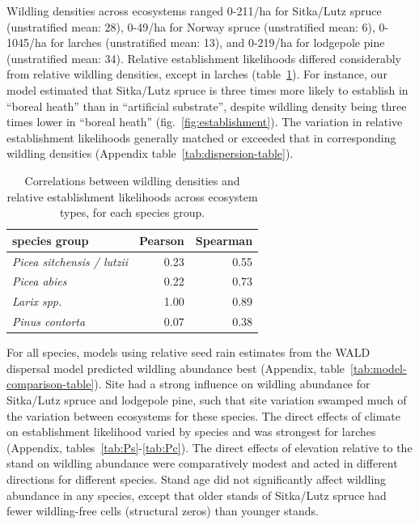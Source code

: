 \documentclass[
]{article}
\begin{document}
Wildling densities across ecosystems ranged 0-211/ha for Sitka/Lutz spruce (unstratified mean: 28), 0-49/ha for Norway spruce (unstratified mean: 6), 0-1045/ha for larches (unstratified mean: 13), and 0-219/ha for lodgepole pine (unstratified mean: 34).
Relative establishment likelihoods differed considerably from relative wildling densities, except in larches (table~\ref{tab:estimate-correlation-table}).
For instance, our model estimated that Sitka/Lutz spruce is three times more likely to establish in ``boreal heath'' than in ``artificial substrate'', despite wildling density being three times lower in ``boreal heath'' (fig.~\ref{fig:establishment}).
The variation in relative establishment likelihoods generally matched or exceeded that in corresponding wildling densities (Appendix table~\ref{tab:dispersion-table}).

\begin{table}

\caption{\label{tab:estimate-correlation-table}Correlations between wildling densities and relative establishment likelihoods across ecosystem types, for each species group.}
\centering
\begin{tabular}[t]{>{}lrr}
\toprule
species group & Pearson & Spearman\\
\midrule
\em{Picea sitchensis / lutzii} & 0.23 & 0.55\\
\em{Picea abies} & 0.22 & 0.73\\
\em{Larix spp.} & 1.00 & 0.89\\
\em{Pinus contorta} & 0.07 & 0.38\\
\bottomrule
\end{tabular}
\end{table}

For all species, models using relative seed rain estimates from the WALD dispersal model predicted wildling abundance best (Appendix, table~\ref{tab:model-comparison-table}).
Site had a strong influence on wildling abundance for Sitka/Lutz spruce and lodgepole pine, such that site variation swamped much of the variation between ecosystems for these species.
The direct effects of climate on establishment likelihood varied by species and was strongest for larches (Appendix, tables~\ref{tab:Ps}-\ref{tab:Pc}).
The direct effects of elevation relative to the stand on wildling abundance were comparatively modest and acted in different directions for different species.
Stand age did not significantly affect wildling abundance in any species, except that older stands of Sitka/Lutz spruce had fewer wildling-free cells (structural zeros) than younger stands.
\end{document}
